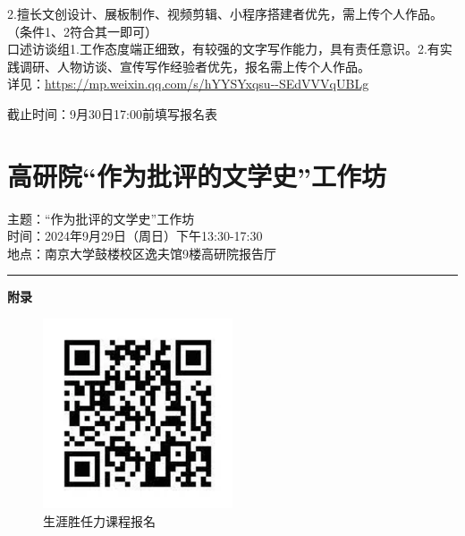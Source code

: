 \documentclass[letterpaper, 12pt]{article}
\begin{document}
\begin{multicols}{2}
2.擅长文创设计、展板制作、视频剪辑、小程序搭建者优先，需上传个人作品。（条件1、2符合其一即可）\\
口述访谈组1.工作态度端正细致，有较强的文字写作能力，具有责任意识。2.有实践调研、人物访谈、宣传写作经验者优先，报名需上传个人作品。\\
详见：\url{https://mp.weixin.qq.com/s/hYYSYxqsu--SEdVVVqUBLg}

截止时间：9月30日17:00前填写报名表

\section{高研院“作为批评的文学史”工作坊}
主题：“作为批评的文学史”工作坊\\
时间：2024年9月29日（周日）下午13:30-17:30\\
地点：南京大学鼓楼校区逸夫馆9楼高研院报告厅\\

\end{multicols} 

\hrule
\vspace{4mm}
\centerline{\huge\textbf{附录}}
\begin{figure}[htbp]
    \centering
    \begin{minipage}[b]{0.32\textwidth}
        \centering
         \includegraphics[width=0.5\textwidth]{640.png}
        \caption{生涯胜任力课程报名}
    \end{minipage}
\end{figure}
\end{document}

